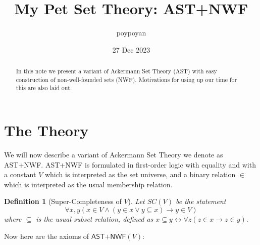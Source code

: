 \documentclass{article}
\title{My Pet Set Theory: \textsf{AST+NWF}}
\author{poypoyan}
\date{27 Dec 2023}   %
\newtheorem{definition}{Definition}[section]
\begin{document}
\maketitle

\begin{abstract}
In this note we present a variant of Ackermann Set Theory (AST) with easy construction of non-well-founded sets (NWF). Motivations for using up our time for this are also laid out.
\end{abstract}

\section{The Theory}
We will now describe a variant of Ackermann Set Theory \cite{ackermann} we denote as \textsf{AST+NWF}. \textsf{AST+NWF} is formulated in first-order logic with equality and with a constant $V$ which is interpreted as the set universe, and a binary relation $\in$ which is interpreted as the usual membership relation.

\begin{definition}[Super-Completeness of $V$]
Let $SC(V)$ be the statement $$\forall x, y (x \in V \wedge (y \in x \vee y \subseteq x) \rightarrow y \in V)$$ where $\subseteq$ is the usual subset relation, defined as $x \subseteq y \leftrightarrow \forall z(z \in x \rightarrow z \in y).$
\end{definition}

\noindent Now here are the axioms of $\textsf{AST+NWF}(V)$:
\end{document}

